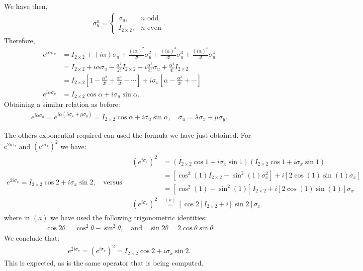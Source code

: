 \documentclass[letterpaper,11pt,twoside]{article}
\begin{document}
We have then,
\begin{align*}
  \sigma_u^n=\begin{cases}
    \sigma_u,&\text{$n$ odd}\\
    I_{2\times2},&\text{$n$ even}
  \end{cases}.
\end{align*}
Therefore,
\begin{align*}
  e^{i\alpha\sigma_u}&=I_{2\times2}+(i\alpha)\sigma_u+\frac{(i\alpha)^2}{2!}\sigma_u^2+\frac{(i\alpha)^3}{3!}\sigma_u^3+\frac{(i\alpha)^4}{4!}\sigma_u^4\\
  &=I_{2\times2}+i\alpha\sigma_u-\frac{\alpha^2}{2!}I_{2\times2}-i\frac{\alpha^3}{3!}\sigma_u+\frac{\alpha^4}{4!}I_{2\times2}\\
  &=I_{2\times2}\left[1-\frac{\alpha^2}{2!}+\frac{\alpha^4}{4!}-\cdots\right]+i\sigma_u\left[\alpha-\frac{\alpha^3}{3!}+\cdots\right]\\
  e^{i\alpha\sigma_u}&=I_{2\times2}\cos\alpha+i\sigma_u\sin\alpha.
\end{align*}
Obtaining a similar relation as before:
\begin{align}
  e^{i\alpha\sigma_u}=e^{i\alpha(\lambda\sigma_x+\mu\sigma_y)}=I_{2\times2}\cos\alpha+i\sigma_u\sin\alpha,\quad\sigma_u=\lambda\sigma_x+\mu\sigma_y.
  \label{eq:formula}
\end{align}

The others exponential required can used the formula we have just obtained. 
For $e^{2i\sigma_x}$ and $(e^{i\sigma_x})^2$ we have:
\begin{align*}
  e^{2i\sigma_x}=I_{2\times2}\cos2+i\sigma_x\sin2,\quad\text{versus}\quad
  \begin{array}{rl}
    (e^{i\sigma_x})^2&=(I_{2\times2}\cos1+i\sigma_x\sin1)(I_{2\times2}\cos1+i\sigma_x\sin1)\\
    &=[\cos^2(1)I_{2\times2}-\sin^2(1)\sigma^2_x]+i[2\cos(1)\sin(1)\sigma_x]\\
    &=[\cos^2(1)-\sin^2(1)]I_{2\times2}+i[2\cos(1)\sin(1)]\sigma_x\\
    (e^{i\sigma_x})^2&\stackrel{(a)}{=}[\cos2]I_{2\times2}+i[\sin2]\sigma_x.
  \end{array}
\end{align*}
where in $(a)$ we have used the following trigonometric identities:
\begin{align*}
  \cos2\theta=\cos^2\theta-\sin^2\theta,\quad\text{and}\quad\sin2\theta=2\cos\theta\sin\theta
\end{align*}
We conclude that:
\begin{align*}
  e^{2i\sigma_x}=(e^{i\sigma_x})^2=I_{2\times2}\cos2+i\sigma_x\sin2.
\end{align*}
This is expected, as is the same operator that is being computed.
\end{document}
